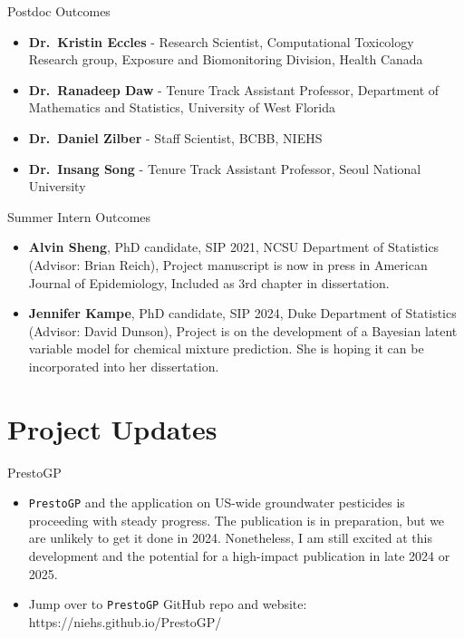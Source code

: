 \documentclass[
  ignorenonframetext,
]{beamer}
\begin{document}
\begin{frame}{Postdoc Outcomes}
\label{postdoc-outcomes}
\begin{itemize}
\item
  \textbf{Dr.~Kristin Eccles} - Research Scientist, Computational
  Toxicology Research group, Exposure and Biomonitoring Division, Health
  Canada
\item
  \textbf{Dr.~Ranadeep Daw} - Tenure Track Assistant Professor,
  Department of Mathematics and Statistics, University of West Florida
\item
  \textbf{Dr.~Daniel Zilber} - Staff Scientist, BCBB, NIEHS
\item
  \textbf{Dr.~Insang Song} - Tenure Track Assistant Professor, Seoul
  National University
\end{itemize}
\end{frame}

\begin{frame}{Summer Intern Outcomes}
\label{summer-intern-outcomes}
\begin{itemize}
\item
  \textbf{Alvin Sheng}, PhD candidate, SIP 2021, NCSU Department of
  Statistics (Advisor: Brian Reich), Project manuscript is now in press
  in American Journal of Epidemiology, Included as 3rd chapter in
  dissertation.
\item
  \textbf{Jennifer Kampe}, PhD candidate, SIP 2024, Duke Department of
  Statistics (Advisor: David Dunson), Project is on the development of a
  Bayesian latent variable model for chemical mixture prediction. She is
  hoping it can be incorporated into her dissertation.
\end{itemize}
\end{frame}

\section{Project Updates}\label{project-updates}

\begin{frame}[fragile]{PrestoGP}
\label{prestogp}
\begin{itemize}
\item
  \texttt{PrestoGP} and the application on US-wide groundwater
  pesticides is proceeding with steady progress. The publication is in
  preparation, but we are unlikely to get it done in 2024. Nonetheless,
  I am still excited at this development and the potential for a
  high-impact publication in late 2024 or 2025.
\item
  Jump over to \texttt{PrestoGP} GitHub repo and website:
  https://niehs.github.io/PrestoGP/
\end{itemize}
\end{frame}
\end{document}
